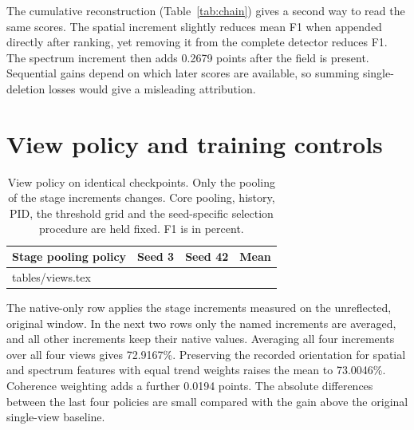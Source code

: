 The cumulative reconstruction (Table~\ref{tab:chain}) gives a second way to read the same scores. The spatial increment slightly reduces mean F1 when appended directly after ranking, yet removing it from the complete detector reduces F1. The spectrum increment then adds 0.2679 points after the field is present. Sequential gains depend on which later scores are available, so summing single-deletion losses would give a misleading attribution.

\section{View policy and training controls}\label{app:training}
\begin{table}[ht]
\caption{View policy on identical checkpoints. Only the pooling of the stage increments changes. Core pooling, history, PID, the threshold grid and the seed-specific selection procedure are held fixed. F1 is in percent.}\label{tab:views}
\centering\small
\begin{tabular}{@{}lrrr@{}}
\toprule Stage pooling policy & Seed 3 & Seed 42 & Mean \\ \midrule
{} tables/views.tex
\bottomrule
\end{tabular}
\end{table}
The native-only row applies the stage increments measured on the unreflected, original window. In the next two rows only the named increments are averaged, and all other increments keep their native values. Averaging all four increments over all four views gives 72.9167\%. Preserving the recorded orientation for spatial and spectrum features with equal trend weights raises the mean to 73.0046\%. Coherence weighting adds a further 0.0194 points. The absolute differences between the last four policies are small compared with the gain above the original single-view baseline.


